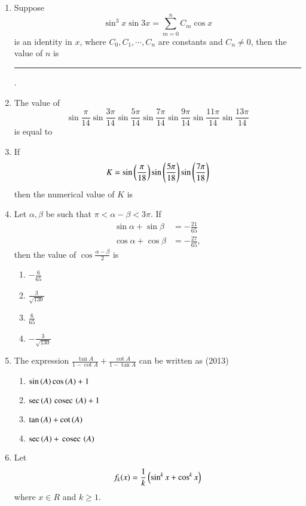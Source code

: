 \begin{enumerate}[label=\thesubsection.\arabic*,ref=\thesubsection.\theenumi]
    \item Suppose $$\sin^3{x}\sin3x = \sum_{m=0}^{n} C_m \cos x $$ is an identity in $x$, where $C_0, C_1, \cdots , C_n$ are constants and $C_n \neq 0$, then the value of $n$ is
\rule{1cm}{0.1pt}.
        \hfill{}
    \item The value of
        \hfill{}
        $$\sin\frac{\pi}{14}\sin\frac{3\pi}{14}\sin\frac{5\pi}{14}\sin\frac{7\pi}{14}
         \sin\frac{9\pi}{14}\sin\frac{11\pi}{14}\sin\frac{13\pi}{14} $$ is equal to  
%
%
%
%
    \item If 
        \hfill{}
	    $$K = \sin\left(\frac{\pi}{18}\right)\sin\left(\frac{5\pi}{18}\right)\sin\left(\frac{7\pi}{18}\right)$$ then the numerical value of $K$ is  
%
\item Let $\alpha,\beta$ be such that $\pi<\alpha-\beta<3\pi$.
If 
\begin{align*}
	\sin\alpha+\sin\beta&=-\frac{21}{65} 
		\\
		\cos\alpha+\cos\beta&=-\frac{27}{65},
\end{align*}
		then the value of $\cos\frac{\alpha-\beta}{2}$ is \hfill{}
\begin{multicols}{4}
\begin{enumerate}
\item $-\frac{6}{65}$
\item $\frac{3}{\sqrt{130}}$
\item $\frac{6}{65}$
\item $-\frac{3}{\sqrt{130}}$
\end{enumerate}
\end{multicols} 
\item The expression $\frac{\tan A}{1-\cot A} +\frac{\cot A}{1-\tan A}$ can be written as
%
\hfill {(2013)}
    \begin{multicols}{2}
\begin{enumerate}
    \item $\sin\left(A\right)\cos\left(A\right)+1$
    \item $\sec\left(A\right)\,\text{cosec}\,\left(A\right)+1$
    \item $\tan\left(A\right)+\cot\left(A\right)$ 
    \item $\sec\left(A\right)+\,\text{cosec}\,\left(A\right)$
    \end{enumerate}
\end{multicols}
\item Let $$f_{k}(x)=\frac{1}{k}\left(\sin^{k}x+\cos^{k}x\right)$$ where $x\in R$ and $k\geq 1$.

\end{enumerate}

